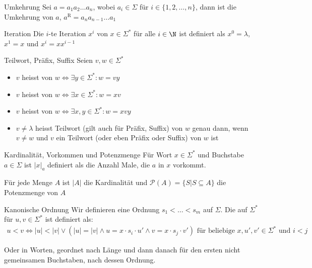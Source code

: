 \begin{definition}[]{Umkehrung}
    Sei $a = a_1 a_2 \ldots a_n$, wobei $a_i \in \Sigma$ für $i \in \{1, 2, \ldots, n\}$, dann ist die Umkehrung von $a$, $a^{\text{R}} = a_n a_{n - 1} \ldots a_1$
\end{definition}


\begin{definition}[]{Iteration}
    Die $i$-te Iteration $x^i$ von $x \in \Sigma^*$ für alle $i \in \N$ ist definiert als $x^0 = \lambda$, $x^1 = x$ und $x^i = xx^{i - 1}$
\end{definition}


\begin{definition}[]{Teilwort, Präfix, Suffix}
    Seien $v, w \in \Sigma^*$
    \begin{itemize}
        \item $v$ heisst  von $w \Longleftrightarrow \exists y \in \Sigma^* : w = vy$
        \item $v$ heisst  von $w \Longleftrightarrow \exists x \in \Sigma^* : w = xv$
        \item $v$ heisst  von $w \Longleftrightarrow \exists x, y \in \Sigma^* : w = xvy$
        \item $v \neq \lambda$ heisst  Teilwort (gilt auch für Präfix, Suffix) von $w$ genau dann, wenn $v \neq w$ und $v$ ein Teilwort (oder eben Präfix oder Suffix) von $w$ ist
    \end{itemize}
\end{definition}

\begin{definition}[]{Kardinalität, Vorkommen und Potenzmenge}
    Für Wort $x \in \Sigma^*$ und Buchstabe $a \in \Sigma$ ist $|x|_a$ definiert als die Anzahl Male, die $a$ in $x$ vorkommt.

    Für jede Menge $A$ ist $|A|$ die Kardinalität und $\mathcal{P}(A) = \{S | S \subseteq A\}$ die Potenzmenge von $A$
\end{definition}


\begin{definition}[]{Kanonische Ordnung}
    Wir definieren eine Ordnung $s_1 < \ldots < s_m$ auf $\Sigma$. Die  auf $\Sigma^*$ für $u, v \in \Sigma^*$ ist definiert als:
    \begin{align*}
        u < v \Longleftrightarrow |u| < |v| \lor (|u| = |v| \land u = x \cdot s_i \cdot u' \land v = x \cdot s_j \cdot v') \text{ für beliebige $x, u', v' \in \Sigma^*$ und $i < j$}
    \end{align*}

    Oder in Worten, geordnet nach Länge und dann danach für den ersten nicht gemeinsamen Buchstaben, nach dessen Ordnung.
\end{definition}


